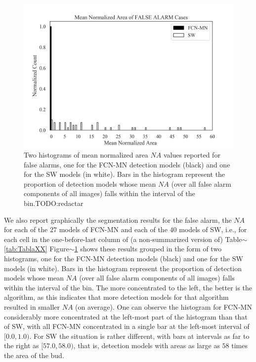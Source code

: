 \documentclass[a4paper,authoryear,review]{elsarticle}
\begin{document}
	
	
	
	
	
	
	
	
	
	
	
	\begin{figure}%
		\centering
		\includegraphics[width=\textwidth]{figures/AAA_mean_relative_area_fcn_vs_sw.png}%
		\caption{Two histograms of mean normalized area $NA$ values reported for false alarms, one for the FCN-MN detection models (black) and one for the SW models (in white). Bars in the histogram represent the proportion of detection models whose mean $NA$ (over all false alarm components of all images) falls within the interval of the bin.TODO:redactar}
		\label{fig:AAA}
	\end{figure}
	
	We also report graphically the segmentation results for the false alarm, the $NA$  for each of the $27$ models of FCN-MN and each of the $40$ models of SW, i.e., for each cell in the  one-before-last column of (a non-summarized version of) Table$\sim$\ref{tab:TablaXX}
	Figure$\sim$\ref{fig:AAA} shows these results grouped in the form of two histograms, one for the FCN-MN detection models (black) and one for the SW models (in white). Bars in the histogram represent the proportion of detection models whose mean $NA$ (over all false alarm components of all images) falls within the interval of the bin. The more concentrated to the left, the better is the algorithm, as this indicates that more detection models for that algorithm resulted in smaller $NA$ (on average).
	One can observe the histogram for FCN-MN considerably more concentrated at the left-most part of the histogram than that of SW, with all FCN-MN concentrated in a single bar at the left-most interval of  $[0.0, 1.0)$. For SW the situation is rather different, with bars at intervals as far to the right as $[57.0, 58.0)$, that is, detection models with areas as large as $58$ times the area of the bud. 
	
\end{document}
